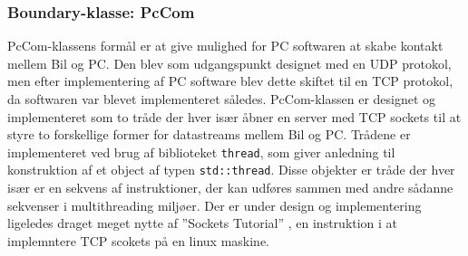 \subsubsection{Boundary-klasse: PcCom} \label{sec:pccom}
PcCom-klassens formål er at give mulighed for PC softwaren at skabe kontakt mellem Bil og PC. 
Den blev som udgangspunkt designet med en UDP protokol, men efter implementering af PC software blev dette skiftet til en TCP protokol, da softwaren var blevet implementeret således. 
PcCom-klassen er designet og implementeret som to tråde der hver især åbner en server med TCP sockets til at styre to forskellige former for datastreams mellem Bil og PC.
Trådene er implementeret ved brug af biblioteket \texttt{thread}, som giver anledning til konstruktion af et object af typen \texttt{std::thread}. 
Disse objekter er tråde der hver især er en sekvens af instruktioner, der kan udføres sammen med andre sådanne sekvenser i multithreading miljøer. 
Der er under design og implementering ligeledes draget meget nytte af ''Sockets Tutorial'' \cite{lib:socket_tutorial}, en instruktion i at implemntere TCP scokets på en linux maskine.